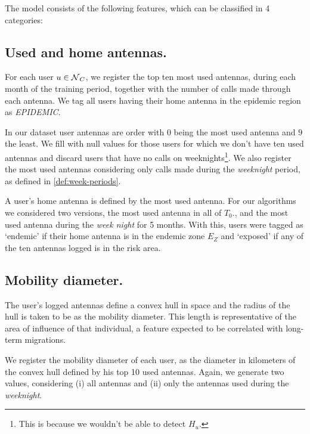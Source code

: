 The model consists of the following features, which can be classified in 4 categories:


\subsection{Used and home antennas.}\label{homeantenna}

For each user $u \in \operatorname{\mathcal{N}}_C$, we register the top ten most used antennas, during each month of the training period,
together with the number of calls made through each antenna. We tag all users having their home antenna in the epidemic region as \textit{EPIDEMIC}.

In our dataset user antennas are order with $0$ being the most used antenna and $9$ the least. We fill with null values for those users for which we don't have ten used antennas and discard users that have no calls on weeknights\footnote{This is because we wouldn't be able to detect $H_u$.}.
%
%
We also register the most used antennas considering only calls made during the \textit{weeknight} period, as defined in \cref{def:week-periods}. %

A user's home antenna is defined by the most used antenna. For our algorithms we considered two versions, the most used antenna in all of $T_0$., and the most used antenna during the \textit{week night} for 5 months.
With this, users were tagged as `endemic' if their home antenna is in the endemic zone $E_Z$ and `exposed' if any of the ten antennas logged is in the risk area.


\subsection{Mobility diameter.}\label{section:def_mobility_diameter}

The user's logged antennas define a convex hull in space and the radius of the hull is taken to be as the mobility diameter. This length is representative of the area of influence of that individual, a feature expected to be correlated with long-term migrations.

We register the mobility diameter of each user, as the diameter in kilometers of the convex hull defined by his top 10 used antennas. Again, we generate two values, considering (i) all antennas and (ii) only the antennas used during the \textit{weeknight}.



